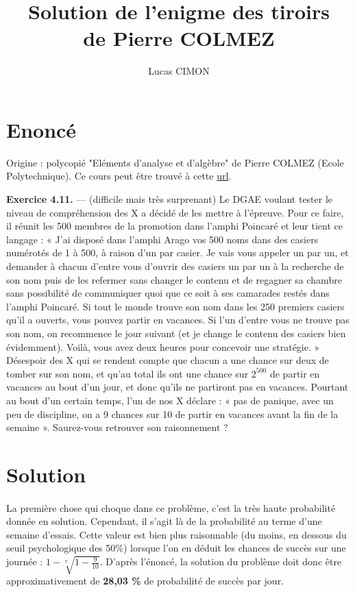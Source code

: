 \documentclass[a4paper,11pt]{article}
\title{Solution de l'enigme des tiroirs \\ de Pierre COLMEZ}
\author{Lucas CIMON}
\begin{document}

\maketitle

\section*{Enoncé}

Origine : polycopié "Eléments d'analyse et d'algèbre" de Pierre COLMEZ (Ecole Polytechnique).
Ce cours peut être trouvé à cette \href{http://people.math.jussieu.fr/~colmez/poly-07.pdf}{url}.

\textbf{Exercice 4.11.} — (difficile mais très surprenant) Le DGAE voulant tester le niveau de compréhension
des X a décidé de les mettre à l’épreuve. Pour ce faire, il réunit les 500 membres de la promotion dans
l’amphi Poincaré et leur tient ce langage : « J’ai disposé dans l’amphi Arago vos 500 noms dans des casiers
numérotés de 1 à 500, à raison d’un par casier. Je vais vous appeler un par un, et demander à chacun
d’entre vous d’ouvrir des casiers un par un à la recherche de son nom puis de les refermer sans changer
le contenu et de regagner sa chambre sans possibilité de communiquer quoi que ce soit à ses camarades
restés dans l’amphi Poincaré. Si tout le monde trouve son nom dans les 250 premiers casiers qu’il a
ouverts, vous pouvez partir en vacances. Si l’un d’entre vous ne trouve pas son nom, on recommence le
jour suivant (et je change le contenu des casiers bien évidemment). Voilà, vous avez deux heures pour
concevoir une stratégie. » Désespoir des X qui se rendent compte que chacun a une chance sur deux de
tomber sur son nom, et qu’au total ils ont une chance sur $2^{500}$ de partir en vacances au bout d’un jour,
et donc qu’ils ne partiront pas en vacances. Pourtant au bout d’un certain temps, l’un de nos X déclare :
« pas de panique, avec un peu de discipline, on a 9 chances sur 10 de partir en vacances avant la fin de
la semaine ». Saurez-vous retrouver son raisonnement ?


\newpage
\section*{Solution}

	\paragraph {}
La première chose qui choque dans ce problème, c'est la très haute probabilité donnée en solution. Cependant, il s'agit là de la probabilité au terme d'une semaine d'essais. Cette valeur est bien plus raisonnable (du moins, en dessous du seuil psychologique des 50\%) lorsque l'on en déduit les chances de succès sur une journée : $1 - \sqrt[7]{1 - \frac{9}{10}}$. D'après l'énoncé, la solution du problème doit donc être approximativement de \textbf{28,03 \%} de probabilité de succès par jour.
\end{document}
